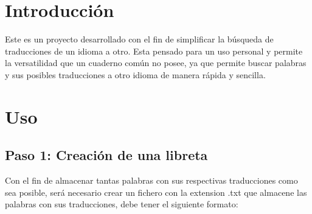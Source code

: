   \hypertarget{index_intro_sec}{}\section{Introducción}\label{index_intro_sec}
Este es un proyecto desarrollado con el fin de simplificar la búsqueda de traducciones de un idioma a otro. Esta pensado para un uso personal y permite la versatilidad que un cuaderno común no posee, ya que permite buscar palabras y sus posibles traducciones a otro idioma de manera rápida y sencilla.\hypertarget{index_use_sec}{}\section{Uso}\label{index_use_sec}
\hypertarget{index_step1}{}\subsection{Paso 1\-: Creación de una libreta}\label{index_step1}
Con el fin de almacenar tantas palabras con sus respectivas traducciones como sea posible, será necesario crear un fichero con la extension .txt que almacene las palabras con sus traducciones, debe tener el siguiente formato\-:



